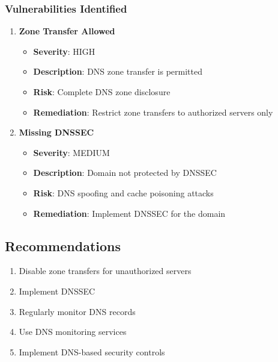 \documentclass[12pt,a4paper]{report}
\begin{document}
\subsubsection{Vulnerabilities Identified}

\begin{enumerate}
    \item \textbf{Zone Transfer Allowed}
    \begin{itemize}
        \item \textbf{Severity}: HIGH
        \item \textbf{Description}: DNS zone transfer is permitted
        \item \textbf{Risk}: Complete DNS zone disclosure
        \item \textbf{Remediation}: Restrict zone transfers to authorized servers only
    \end{itemize}
    
    \item \textbf{Missing DNSSEC}
    \begin{itemize}
        \item \textbf{Severity}: MEDIUM
        \item \textbf{Description}: Domain not protected by DNSSEC
        \item \textbf{Risk}: DNS spoofing and cache poisoning attacks
        \item \textbf{Remediation}: Implement DNSSEC for the domain
    \end{itemize}
\end{enumerate}

\subsection{Recommendations}

\begin{enumerate}
    \item Disable zone transfers for unauthorized servers
    \item Implement DNSSEC
    \item Regularly monitor DNS records
    \item Use DNS monitoring services
    \item Implement DNS-based security controls
\end{enumerate}
\end{document}

